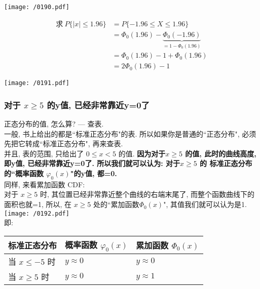 \documentclass[UTF8]{ctexart}
\begin{document}
\texttt{[image: /0190.pdf]} \\
	
	
\begin{myEnvSample}
	\begin{align*}  %
	\text{求} \ P\{|x|\leq 1.96\} &=P\{-1.96\leq X\leq 1.96\}\\
&=\varPhi _0(1.96)-\underset{=1-\varPhi _0(1.96)}{\underbrace{\varPhi _0(-1.96)}}\\
&=\varPhi _0(1.96)-1+\varPhi _0(1.96)\\
&=2\varPhi _0(1.96)-1
	\end{align*}

\texttt{[image: /0191.pdf]} 
\end{myEnvSample}	






\subsubsection{对于 $ x \geq 5$ 的y值, 已经非常靠近y=0了}

正态分布的值, 怎么算? --- 查表. \\
一般, 书上给出的都是``标准正态分布"的表. 所以如果你是普通的``正态分布", 必须先把它转成``标准正态分布", 再来查表. \\

并且, 表的范围, 只给出了 $ 0 \leq x < 5$  的值. \textbf{因为对于$ x \geq 5$ 的值, 此时的曲线高度, 即y值, 已经非常靠近y=0了. 所以我们就可以认为: 对于$ x \geq 5$ 的 标准正态分布的``概率函数 $ \varphi_0(x)$"的y值, 都=0.} \\


同样, 来看累加函数 CDF: \\
对于 $ x \geq 5$ 时, 其位置已经非常靠近整个曲线的右端末尾了, 而整个函数曲线下的面积也就=1, 所以, 在 $ x \geq 5$  处的``累加函数$ \Phi_0(x)$", 其值我们就可以认为是1. \\

\texttt{[image: /0192.pdf]}  \\

即: \\
\begin{tabular}{|l|l|l|}
	\hline
	标准正态分布 & 概率函数 $\varphi _0(x)$  & 累加函数 $\Phi _0(x)$ \\
	\hline
	当 $x \leq -5$ 时 & $y \approx 0$ & $y \approx 0$\\
	\hline
	当 $x \geq 5$ 时 & $y \approx 0$ & $y \approx 1$\\
	\hline
\end{tabular} \\
\end{document}
